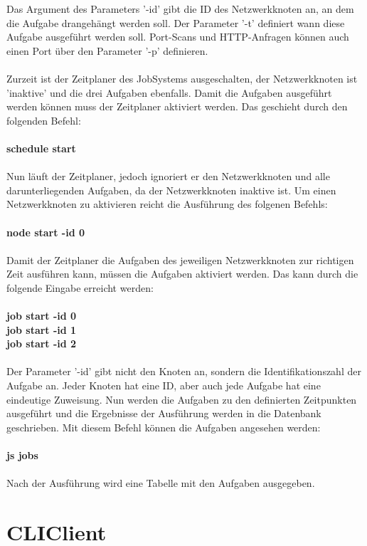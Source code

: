 \documentclass[12pt,a4paper]{report}
\begin{document}
Das Argument des Parameters '-id' gibt die ID des Netzwerkknoten an, an dem die Aufgabe drangehängt werden soll. Der Parameter '-t' definiert wann diese Aufgabe ausgeführt werden soll. Port-Scans und HTTP-Anfragen können auch einen Port über den Parameter '-p' definieren.\\\\
Zurzeit ist der Zeitplaner des JobSystems ausgeschalten, der Netzwerkknoten ist 'inaktive' und die drei Aufgaben ebenfalls. Damit die Aufgaben ausgeführt werden können muss der Zeitplaner aktiviert werden. Das geschieht durch den folgenden Befehl:\\\\
\textbf{schedule start}\\\\
Nun läuft der Zeitplaner, jedoch ignoriert er den Netzwerkknoten und alle darunterliegenden Aufgaben, da der Netzwerkknoten inaktive ist. Um einen Netzwerkknoten zu aktivieren reicht die Ausführung des folgenen Befehls:\\\\
\textbf{node start -id 0}\\\\
Damit der Zeitplaner die Aufgaben des jeweiligen Netzwerkknoten zur richtigen Zeit ausführen kann, müssen die Aufgaben aktiviert werden. Das kann durch die folgende Eingabe erreicht werden:\\\\
\textbf{job start -id 0}\\
\textbf{job start -id 1}\\
\textbf{job start -id 2}\\\\
Der Parameter '-id' gibt nicht den Knoten an, sondern die Identifikationszahl der Aufgabe an. Jeder Knoten hat eine ID, aber auch jede Aufgabe hat eine eindeutige Zuweisung. Nun werden die Aufgaben zu den definierten Zeitpunkten ausgeführt und die Ergebnisse der Ausführung werden in die Datenbank geschrieben. Mit diesem Befehl können die Aufgaben angesehen werden: \\\\
\textbf{js jobs}\\\\
Nach der Ausführung wird eine Tabelle mit den Aufgaben ausgegeben.

\chapter{CLIClient}
\end{document}
